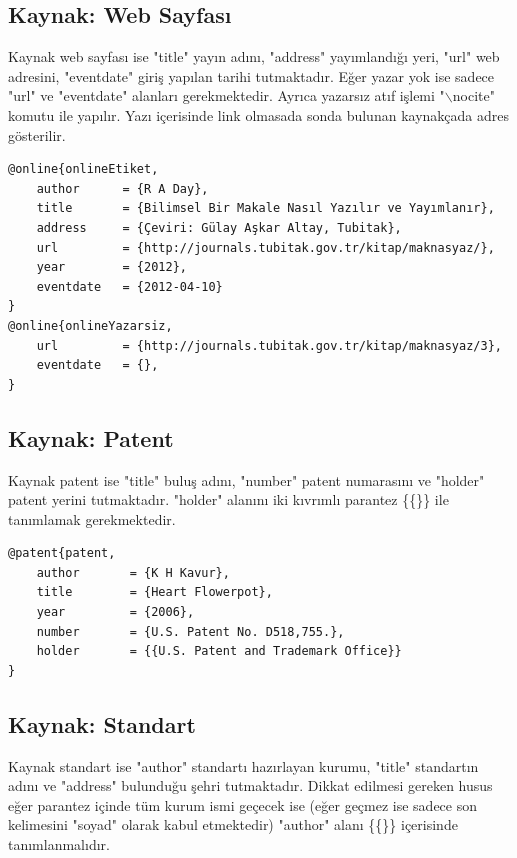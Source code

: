 \subsection{Kaynak: Web Sayfası}

Kaynak web sayfası ise "title" yayın adını, "address" yayımlandığı yeri, "url" web adresini, "eventdate" giriş yapılan tarihi tutmaktadır. Eğer yazar yok ise sadece "url" ve "eventdate" alanları gerekmektedir. Ayrıca yazarsız atıf işlemi "$\backslash$nocite" komutu ile yapılır. Yazı içerisinde link olmasada sonda bulunan kaynakçada adres gösterilir.

\begin{lstlisting}[language={[LaTeX]{TeX}}, label=bib:web, caption=Kaynak web sayfası ise]
@online{onlineEtiket,
	author		= {R A Day},
	title		= {Bilimsel Bir Makale Nasıl Yazılır ve Yayımlanır},
	address 	= {Çeviri: Gülay Aşkar Altay, Tubitak},
	url			= {http://journals.tubitak.gov.tr/kitap/maknasyaz/},
	year		= {2012},
	eventdate	= {2012-04-10}
}
@online{onlineYazarsiz,
	url			= {http://journals.tubitak.gov.tr/kitap/maknasyaz/3},
	eventdate	= {},
}
\end{lstlisting}

\subsection{Kaynak: Patent}

Kaynak patent ise "title" buluş adını, "number" patent numarasını ve "holder" patent yerini tutmaktadır. "holder" alanını iki kıvrımlı parantez \{\{\}\} ile tanımlamak gerekmektedir. 

\begin{lstlisting}[language={[LaTeX]{TeX}}, label=bib:patent, caption=Kaynak patent ise]
@patent{patent,
	author       = {K H Kavur},
	title        = {Heart Flowerpot},
	year		 = {2006},
	number       = {U.S. Patent No. D518,755.},
	holder       = {{U.S. Patent and Trademark Office}}	
}
\end{lstlisting}

\subsection{Kaynak: Standart}

Kaynak standart ise "author" standartı hazırlayan kurumu, "title" standartın adını ve "address" bulunduğu şehri tutmaktadır. Dikkat edilmesi gereken husus eğer parantez içinde tüm kurum ismi geçecek ise (eğer geçmez ise sadece son kelimesini "soyad" olarak kabul etmektedir) "author" alanı \{\{\}\} içerisinde tanımlanmalıdır.

